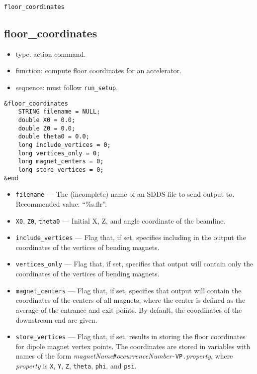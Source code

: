 \documentclass[11pt]{article}
\begin{document}
\newpage
\begin{center}{\Large\verb|floor_coordinates|}\end{center}
\subsection{floor\_coordinates \label{subsec:floorcoordinates}}

\begin{itemize}
\item type: action command.
\item function: compute floor coordinates for an accelerator.
\item sequence: must follow \verb|run_setup|.
\end{itemize}

\begin{verbatim}
&floor_coordinates
    STRING filename = NULL;
    double X0 = 0.0;
    double Z0 = 0.0;
    double theta0 = 0.0;
    long include_vertices = 0;
    long vertices_only = 0;
    long magnet_centers = 0;
    long store_vertices = 0;
&end
\end{verbatim}

\begin{itemize}
\item \verb|filename| --- The (incomplete) name of an SDDS file to send output to.  
 Recommended value: ``\%s.flr''.
\item \verb|X0|, \verb|Z0|, \verb|theta0| --- Initial X, Z, and angle coordinate of the beamline.
\item \verb|include_vertices| --- Flag that, if set, specifies including  in the output
the coordinates of the vertices of bending magnets. 
\item \verb|vertices_only| --- Flag that, if set, specifies that output will contain only
the coordinates of the vertices of bending magnets. 
\item \verb|magnet_centers| --- Flag that, if set, specifies that output will contain 
the coordinates of the centers of all magnets, where the center is defined as the average of the
entrance and exit points. By default, the coordinates of the downstream
end are given.
\item \verb|store_vertices| --- Flag that, if set, results in storing the floor coordinates for
  dipole magnet vertex points. The coordinates are stored in variables with names of the form
  {\em magnetName}\verb|#|{\em occurrenceNumber}\verb|-VP.|{\em property}, where {\em property}
  is \verb|X|, \verb|Y|, \verb|Z|, \verb|theta|, \verb|phi|, and \verb|psi|.
\end{itemize}
\end{document}
